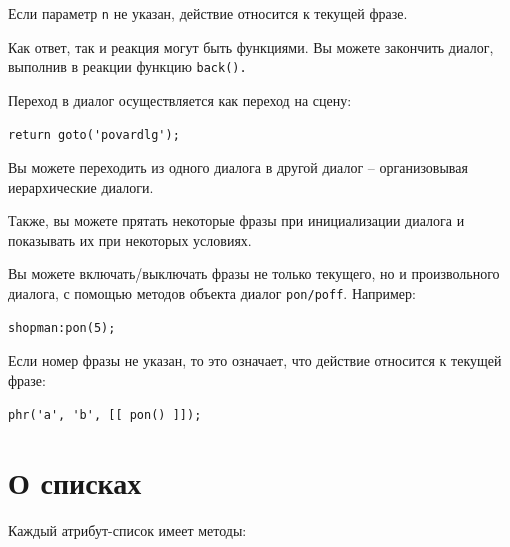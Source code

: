 \documentclass[a4paper,12pt]{article}
\begin{document}
Если параметр \verb/n/ не указан, действие относится к текущей фразе.

Как ответ, так и реакция могут быть функциями. Вы можете закончить диалог, выполнив в реакции функцию \verb/back()./

Переход в диалог осуществляется как переход на сцену:

\begin{verbatim}
return goto('povardlg');
\end{verbatim}

Вы можете переходить из одного диалога в другой диалог -- организовывая иерархические диалоги.

Также, вы можете прятать некоторые фразы при инициализации диалога и показывать их при некоторых условиях.

Вы можете включать/выключать фразы не только текущего, но и произвольного диалога, с помощью методов объекта диалог \verb,pon/poff,. Например:

\begin{verbatim}
shopman:pon(5);
\end{verbatim}

Если номер фразы не указан, то это означает, что действие относится к текущей фразе:

\begin{verbatim}
phr('a', 'b', [[ pon() ]]);
\end{verbatim}

\section{О списках}

Каждый атрибут-список имеет методы:
\end{document}
